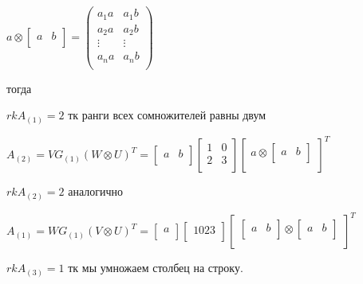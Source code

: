 \documentclass[a4paper, 11pt]{article}
\begin{document}
\begin{enumerate}
\begin{enumerate}
			$a \otimes \begin{bmatrix}
				a & b \\
			\end{bmatrix} = \begin{pmatrix}
			a_1 a & a_1 b \\
			a_2 a & a_2 b \\
			\vdots & \vdots \\
			a_n a & a_n b \\
		\end{pmatrix}$ 
		
		
		тогда 
		
		$rk A_{(1)} = 2$ тк ранги всех сомножителей равны двум
		
		
		$A_{(2)} = V G_{(1)} (W \otimes U)^T = \begin{bmatrix}
			a & b \\
		\end{bmatrix} \begin{bmatrix}
			1 & 0 \\
			2 & 3 \\
		\end{bmatrix} \begin{bmatrix}
			a \otimes \begin{bmatrix}
				a & b \\
			\end{bmatrix} \\
		\end{bmatrix}^T$
	
		$rk A_{(2)} = 2$ аналогично 
		
		
		$A_{(1)} = W G_{(1)} (V \otimes U)^T = \begin{bmatrix}
			a  \\
		\end{bmatrix} \begin{bmatrix}
			1023 \\
		\end{bmatrix} \begin{bmatrix}
			\begin{bmatrix}
				a & b \\
			\end{bmatrix} \otimes \begin{bmatrix}
				a & b \\
			\end{bmatrix} \\
		\end{bmatrix}^T$
	
		$rk A_{(3)} = 1$ тк мы умножаем столбец на строку.
			

\end{enumerate}
\end{enumerate}
\end{document}
